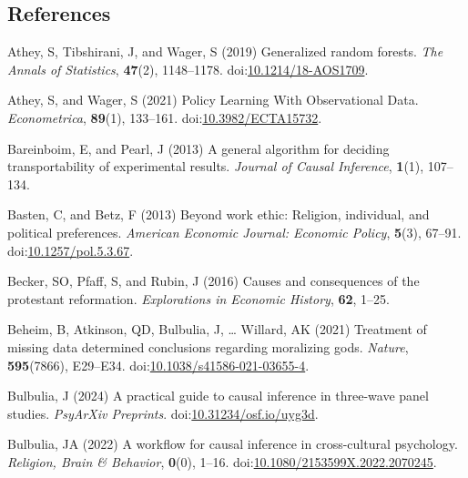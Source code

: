 \documentclass[
  single column]{article}
\newlength{\cslhangindent}
\newenvironment{CSLReferences}[2] %
 {\begin{list}{}{%
  \setlength{\itemindent}{0pt}
  \setlength{\leftmargin}{0pt}
  \setlength{\parsep}{0pt}
  \ifodd #1
   \setlength{\leftmargin}{\cslhangindent}
   \setlength{\itemindent}{-1\cslhangindent}
  \fi
  \setlength{\itemsep}{#2\baselineskip}}}
 {\end{list}}
\begin{document}
\newpage{}

\subsection{References}\label{references}

\label{refs}
\begin{CSLReferences}{1}{0}
Athey, S, Tibshirani, J, and Wager, S (2019) Generalized random forests.
\emph{The Annals of Statistics}, \textbf{47}(2), 1148--1178.
doi:\href{https://doi.org/10.1214/18-AOS1709}{10.1214/18-AOS1709}.

Athey, S, and Wager, S (2021) Policy Learning With Observational Data.
\emph{Econometrica}, \textbf{89}(1), 133--161.
doi:\href{https://doi.org/10.3982/ECTA15732}{10.3982/ECTA15732}.

Bareinboim, E, and Pearl, J (2013) A general algorithm for deciding
transportability of experimental results. \emph{Journal of Causal
Inference}, \textbf{1}(1), 107--134.

Basten, C, and Betz, F (2013) Beyond work ethic: Religion, individual,
and political preferences. \emph{American Economic Journal: Economic
Policy}, \textbf{5}(3), 67--91.
doi:\href{https://doi.org/10.1257/pol.5.3.67}{10.1257/pol.5.3.67}.

Becker, SO, Pfaff, S, and Rubin, J (2016) Causes and consequences of the
protestant reformation. \emph{Explorations in Economic History},
\textbf{62}, 1--25.

Beheim, B, Atkinson, QD, Bulbulia, J, \ldots{} Willard, AK (2021)
Treatment of missing data determined conclusions regarding moralizing
gods. \emph{Nature}, \textbf{595}(7866), E29--E34.
doi:\href{https://doi.org/10.1038/s41586-021-03655-4}{10.1038/s41586-021-03655-4}.

Bulbulia, J (2024) A practical guide to causal inference in three-wave
panel studies. \emph{PsyArXiv Preprints}.
doi:\href{https://doi.org/10.31234/osf.io/uyg3d}{10.31234/osf.io/uyg3d}.

Bulbulia, JA (2022) A workflow for causal inference in cross-cultural
psychology. \emph{Religion, Brain \& Behavior}, \textbf{0}(0), 1--16.
doi:\href{https://doi.org/10.1080/2153599X.2022.2070245}{10.1080/2153599X.2022.2070245}.


\end{CSLReferences}
\end{document}
